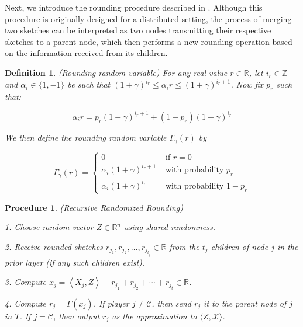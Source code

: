 \documentclass{article}
\theoremstyle{plain}
\newtheorem{defn}[theorem]{Definition}
\newtheorem{procedure}[theorem]{Procedure}
\begin{document}
Next, we introduce the rounding procedure described in \cite{rounding}. Although this procedure is originally designed for a distributed setting, the process of merging two sketches can be interpreted as two nodes transmitting their respective sketches to a parent node, which then performs a new rounding operation based on the information received from its children.

\begin{defn}\cite{rounding}(Rounding random variable)  \label{rounding variable}
    For any real value $r \in \mathbb{R}$, let $i_r \in \mathbb{Z}$ and $\alpha_i \in\{1,-1\}$ be such that $(1+\gamma)^{i_r} \leq \alpha_i r \leq(1+\gamma)^{i_r+1}$. Now fix $p_r$ such that:

$$
\alpha_i r=p_r(1+\gamma)^{i_r+1}+\left(1-p_r\right)(1+\gamma)^{i_r}
$$


We then define the rounding random variable $\Gamma_{\gamma}(r)$ by

$$
\Gamma_{\gamma}(r)= \begin{cases}0 & \text { if } r=0 \\ \alpha_i(1+\gamma)^{i_r+1} & \text { with probability } p_r \\ \alpha_i(1+\gamma)^{i_r} & \text { with probability } 1-p_r\end{cases}
$$
    
\end{defn}

\begin{procedure}(Recursive Randomized Rounding) \label{distributed rounding procedure}

1. Choose random vector $Z \in \mathbb{R}^n$ using shared randomness.

2. Receive rounded sketches $r_{j_1}, r_{j_2}, \ldots, r_{j_{t_j}} \in \mathbb{R}$ from the $t_j$ children of node $j$ in the prior layer (if any such children exist).

3. Compute $x_j=\left\langle X_j, Z\right\rangle+r_{j_1}+r_{j_2}+\cdots+r_{j_t} \in \mathbb{R}$.

4. Compute $r_j=\Gamma\left(x_j\right)$. If player $j \neq \mathcal{C}$, then send $r_j$ it to the parent node of $j$ in $T$. If $j=\mathcal{C}$, then output $r_j$ as the approximation to $\langle Z, \mathcal{X}\rangle$.
\end{procedure}
\end{document}
